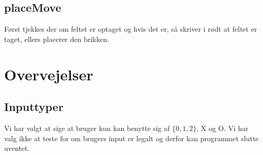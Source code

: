 \documentclass[a4paper,12pt]{article}
\begin{document}
\subsection*{placeMove}
Først tjekkes der om feltet er optaget og hvis det er, så skriver i rødt at feltet er taget, ellers placerer den brikken.


\section*{Overvejelser}
\subsection*{Inputtyper}
Vi har valgt at sige at bruger kun kan benytte sig af $\{0,1,2\}$, X og O. Vi har valg ikke at teste for om brugers input er legalt og derfor kan programmet slutte uventet.
\end{document}

